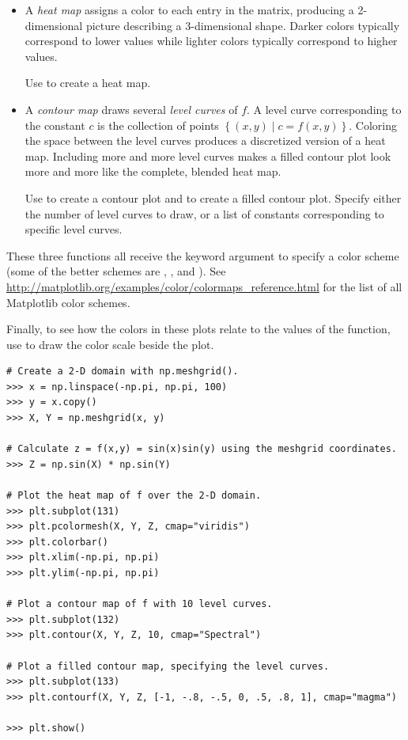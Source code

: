 \begin{itemize}
\item A \emph{heat map} assigns a color to each entry in the matrix, producing a 2-dimensional picture describing a 3-dimensional shape.
Darker colors typically correspond to lower values while lighter colors typically correspond to higher values.

Use  to create a heat map.

\item A \emph{contour map} draws several \emph{level curves} of $f$.
A level curve corresponding to the constant $c$ is the collection of points $\left\{(x,y)\mid c = f(x,y)\right\}$.
Coloring the space between the level curves produces a discretized version of a heat map.
Including more and more level curves makes a filled contour plot look more and more like the complete, blended heat map.

Use  to create a contour plot and  to create a filled contour plot.
Specify either the number of level curves to draw, or a list of constants corresponding to specific level curves.
\end{itemize}

These three functions all receive the keyword argument  to specify a color scheme (some of the better schemes are , , and ).
See \url{http://matplotlib.org/examples/color/colormaps_reference.html} for the list of all Matplotlib color schemes.

Finally, to see how the colors in these plots relate to the values of the function, use  to draw the color scale beside the plot.

\begin{lstlisting}
# Create a 2-D domain with np.meshgrid().
>>> x = np.linspace(-np.pi, np.pi, 100)
>>> y = x.copy()
>>> X, Y = np.meshgrid(x, y)

# Calculate z = f(x,y) = sin(x)sin(y) using the meshgrid coordinates.
>>> Z = np.sin(X) * np.sin(Y)

# Plot the heat map of f over the 2-D domain.
>>> plt.subplot(131)
>>> plt.pcolormesh(X, Y, Z, cmap="viridis")
>>> plt.colorbar()
>>> plt.xlim(-np.pi, np.pi)
>>> plt.ylim(-np.pi, np.pi)

# Plot a contour map of f with 10 level curves.
>>> plt.subplot(132)
>>> plt.contour(X, Y, Z, 10, cmap="Spectral")

# Plot a filled contour map, specifying the level curves.
>>> plt.subplot(133)
>>> plt.contourf(X, Y, Z, [-1, -.8, -.5, 0, .5, .8, 1], cmap="magma")

>>> plt.show()
\end{lstlisting}

